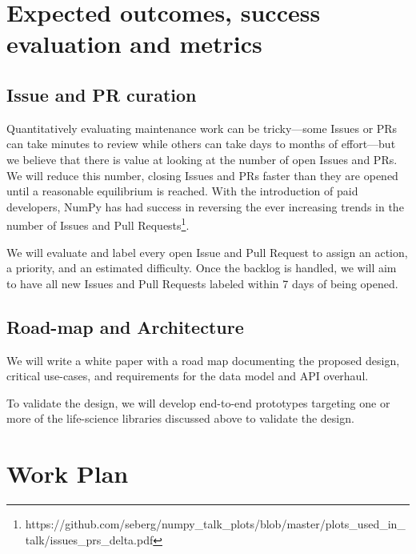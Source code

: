 \documentclass[11pt,letterpaper]{article}  %
\begin{document}
\section{Expected outcomes, success evaluation and metrics}
\subsection{Issue and PR curation}

Quantitatively evaluating maintenance work can be tricky---some Issues
or PRs can take minutes to review while  others can take days to
months of effort---but we believe that there is value at looking at
the number of open Issues and PRs.  We will reduce this
number, closing Issues and PRs faster than they are
opened until a reasonable equilibrium is reached.
With the introduction of paid developers,
NumPy has had success in reversing the ever increasing trends
in the number of Issues and Pull Requests\footnote{https://github.com/seberg/numpy\_talk\_plots/blob/master/plots\_used\_in\_talk/issues\_prs\_delta.pdf}.


We will evaluate and label every open Issue and Pull Request to
assign an action, a priority, and an estimated
difficulty.  Once the backlog is handled, we will aim to have all new Issues and
Pull Requests labeled within 7 days of being opened.

\subsection{Road-map and Architecture}

We will write a white paper with a road map documenting the proposed
design, critical use-cases, and requirements for the data model and
API overhaul.

To validate the design, we will develop end-to-end prototypes
targeting one or more of the life-science libraries discussed above
to validate the design.


\section{Work Plan}
\end{document}
